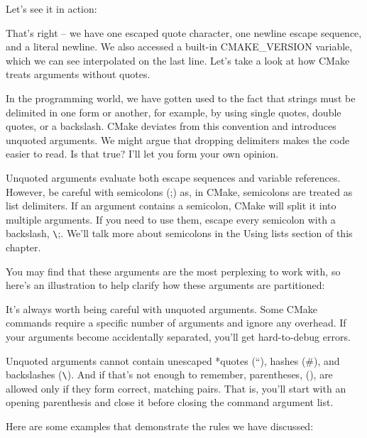 Let’s see it in action:


That’s right – we have one escaped quote character, one newline escape sequence, and a literal newline. We also accessed a built-in CMAKE\_VERSION variable, which we can see interpolated on the last line. Let’s take a look at how CMake treats arguments without quotes.


In the programming world, we have gotten used to the fact that strings must be delimited in one form or another, for example, by using single quotes, double quotes, or a backslash. CMake deviates from this convention and introduces unquoted arguments. We might argue that dropping delimiters makes the code easier to read. Is that true? I’ll let you form your own opinion.

Unquoted arguments evaluate both escape sequences and variable references. However, be careful with semicolons (;) as, in CMake, semicolons are treated as list delimiters. If an argument contains a semicolon, CMake will split it into multiple arguments. If you need to use them, escape every semicolon with a backslash,  \verb|\|;. We’ll talk more about semicolons in the Using lists section of this chapter.

You may find that these arguments are the most perplexing to work with, so here’s an illustration to help clarify how these arguments are partitioned:


It’s always worth being careful with unquoted arguments. Some CMake commands require a specific number of arguments and ignore any overhead. If your arguments become accidentally separated, you’ll get hard-to-debug errors.

Unquoted arguments cannot contain unescaped *quotes (“), hashes (\#), and backslashes (\verb|\|).
And if that’s not enough to remember, parentheses, (), are allowed only if they form correct, matching pairs. That is, you’ll start with an opening parenthesis and close it before closing the command argument list.

Here are some examples that demonstrate the rules we have discussed:

